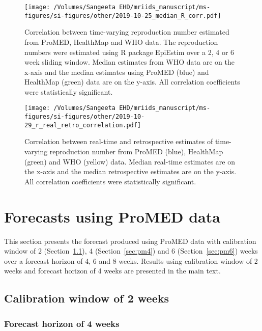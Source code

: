 \documentclass[9pt,twoside,lineno]{pnas-new}
\begin{document}
\begin{figure}
  \centering
  \texttt{[image: /Volumes/Sangeeta EHD/mriids\_manuscript/ms-figures/si-figures/other/2019-10-25\_median\_R\_corr.pdf]}
  \caption{Correlation between time-varying reproduction number estimated from
    ProMED, HealthMap and WHO data. The reproduction numbers were
    estimated using R package EpiEstim over a 2, 4 or 6 week sliding
    window. Median estimates from WHO data are on the x-axis and the
    median estimates using ProMED (blue) and HealthMap (green) data
    are on the y-axis. All correlation coefficients were statistically
  significant.}
  \label{fig:rcorr}
\end{figure}\FloatBarrier


\begin{figure}
  \centering
  \texttt{[image: /Volumes/Sangeeta EHD/mriids\_manuscript/ms-figures/si-figures/other/2019-10-29\_r\_real\_retro\_correlation.pdf]}
  \caption{Correlation between real-time and retrospective estimates
    of time-varying reproduction number from
    ProMED (blue), HealthMap (green) and WHO (yellow) data. 
    Median real-time estimates are on the x-axis and the
    median retrospective estimates are on the y-axis. 
   All correlation coefficients were statistically significant.}
  \label{fig:rcorrrealretro}
\end{figure}\FloatBarrier

\section{Forecasts using ProMED data}\label{sec:pm} 

This section presents the forecast produced using ProMED data with
calibration window of 2 (Section~\ref{sec:pm2}), 
4 (Section~\ref{sec:pm4}) and 6 
(Section~\ref{sec:pm6}) weeks over a 
forecast horizon of 4, 6 and 8 weeks. Results using calibration window
of 2 weeks and forecast horizon of 4 weeks are presented in the main
text.

\subsection{Calibration window of 2 weeks}\label{sec:pm2}
\subsubsection{Forecast horizon of 4 weeks}\label{sec:pm24}
\end{document}
